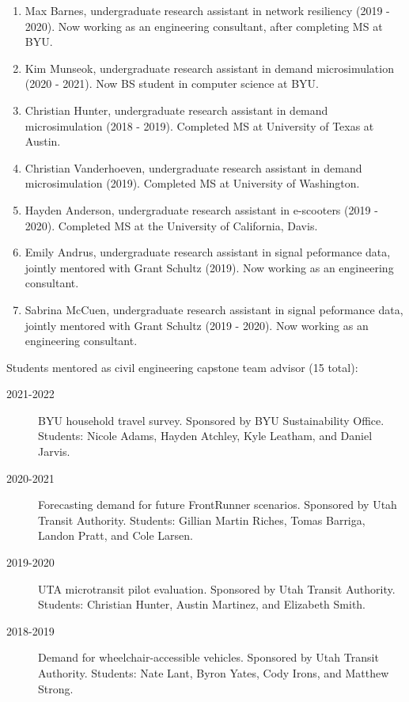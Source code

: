 \documentclass[margin,line]{res}
\newcounter{enuminitialize}
\newenvironment{myenum}[1][]
{%
 \setcounter{enuminitialize}{#1}
 \addtocounter{enuminitialize}{2}
 \begin{enumerate}[left= 4pt, itemsep=12pt, start=\value{enuminitialize}, label=\arabic*\addtocounter{enumi}{-2}]
}
{%
 \end{enumerate}
}
\newcommand{\secfont}{\scshape }
\newcommand{\acc}{\scshape }
\begin{document}
\begin{resume}
\begin{myenum}[22]
  \item Max Barnes, undergraduate research assistant in network resiliency (2019 - 2020). Now working as an engineering consultant, after completing MS at BYU.
  \item Kim Munseok, undergraduate research assistant in demand microsimulation (2020 - 2021). Now BS student in computer science at BYU.
  \item Christian Hunter, undergraduate research assistant in demand microsimulation (2018 - 2019). Completed MS at University of Texas at Austin.
  \item Christian Vanderhoeven, undergraduate research assistant in demand microsimulation (2019). Completed MS at University of Washington.
  \item Hayden Anderson, undergraduate research assistant in e-scooters (2019 - 2020). Completed MS at the University of California, Davis.
  \item Emily Andrus, undergraduate research assistant in signal peformance data, jointly mentored with Grant Schultz (2019). Now working as an engineering consultant.
  \item Sabrina McCuen, undergraduate research assistant in signal peformance data, jointly mentored with Grant Schultz (2019 - 2020). Now working as an engineering consultant.
\end{myenum}


Students mentored as civil engineering capstone team advisor (15 total):
\vspace{0.2cm}
\begin{description}
  \item[2021-2022] BYU household travel survey. Sponsored by BYU Sustainability Office. Students: Nicole Adams, Hayden Atchley, Kyle Leatham, and Daniel Jarvis.
  \item[2020-2021] Forecasting demand for future FrontRunner scenarios. Sponsored by Utah Transit Authority. Students: Gillian Martin Riches, Tomas Barriga, Landon Pratt, and Cole Larsen.
  \item[2019-2020] UTA microtransit pilot evaluation. Sponsored by Utah Transit Authority. Students: Christian Hunter, Austin Martinez, and Elizabeth Smith.
  \item[2018-2019] Demand for wheelchair-accessible vehicles. Sponsored by Utah Transit Authority. Students: Nate Lant, Byron Yates, Cody Irons, and Matthew Strong.
\end{description}


%




\end{resume}
\end{document}
